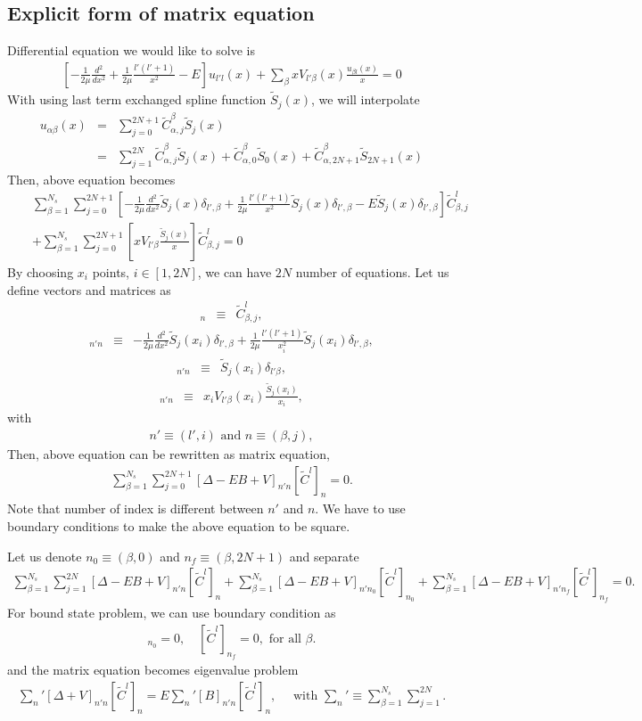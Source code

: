 \documentclass[10pt]{book}
\newcommand{\bea}{\begin{eqnarray}}
\newcommand{\eea}{\end{eqnarray}}
\newcommand{\no}{\nonumber \\}
\begin{document}
\subsection{Explicit form of matrix equation}
Differential equation we would like to solve is
\bea 
\left[ -\frac{1}{2\mu}\frac{d^2}{dx^2}+\frac{1}{2\mu}\frac{l'(l'+1)}{x^2}-E\right] 
u_{l' l}(x)+\sum_{\beta} x V_{l'\beta}(x) \frac{u_{\beta l}(x)}{x} =0
\eea 
With using last term exchanged spline function $\tilde{S}_j(x)$,
we will interpolate
\bea 
u_{\alpha\beta}(x)&=&\sum_{j=0}^{2N+1}\tilde{C}_{\alpha,j}^{\beta} \tilde{S}_j(x) \no 
                  &=&\sum_{j=1}^{2N} \tilde{C}_{\alpha,j}^{\beta} \tilde{S}_j(x)
                  +\tilde{C}_{\alpha,0}^{\beta} \tilde{S}_0(x)
                  +\tilde{C}_{\alpha,2N+1}^{\beta} \tilde{S}_{2N+1}(x)
\eea 
Then, above equation becomes
\bea 
& &\sum_{\beta=1}^{N_{s}}\sum_{j=0}^{2N+1} 
\left[-\frac{1}{2\mu}\frac{d^2}{dx^2}\tilde{S}_j(x)\delta_{l',\beta}
     +\frac{1}{2\mu}\frac{l'(l'+1)}{x^2}\tilde{S}_j(x)\delta_{l',\beta}-E\tilde{S}_j(x)\delta_{l',\beta}
     \right]
     \tilde{C}_{\beta,j}^{l} \no 
& &+\sum_{\beta=1}^{N_{s}}\sum_{j=0}^{2N+1}
 \left[x V_{l'\beta}\frac{\tilde{S}_j(x)}{x} \right]\tilde{C}_{\beta,j}^{l} =0
\eea 
By choosing $x_i$ points, $i\in[1,2N]$, 
we can have $2N$ number of equations.
Let us define vectors and matrices as
\bea 
[\tilde{C}^l]_{n}&\equiv& \tilde{C}^l_{\beta,j} ,
\eea
\bea 
[\Delta]_{n'n}&\equiv& 
         -\frac{1}{2\mu}\frac{d^2}{dx^2}\tilde{S}_j(x_i)\delta_{l',\beta}
              +\frac{1}{2\mu}\frac{l'(l'+1)}{x_i^2}\tilde{S}_j(x_i)\delta_{l',\beta},   
\eea 
\bea 
[B]_{n'n}&\equiv& \tilde{S}_j(x_i) \delta_{l'\beta}, 
\eea 
\bea 
[V]_{n'n}&\equiv& x_i V_{l'\beta}(x_i)\frac{\tilde{S}_j(x_i)}{x_i}, 
\eea 
with
\bea 
n'\equiv(l',i) \mbox{ and }  n\equiv(\beta,j),
\eea 
Then, above equation can be rewritten as matrix equation,
\bea 
\sum_{\beta=1}^{N_{s}}\sum_{j=0}^{2N+1}[\Delta -E B +V]_{n'n}[\tilde{C}^l]_n=0.
\eea 
Note that number of index is different between $n'$ and $n$. 
We have to use boundary conditions to make the above equation to be 
square. 

Let us denote $n_0\equiv(\beta,0)$ and $n_f\equiv(\beta,2N+1)$ and separate
\bea 
\sum_{\beta=1}^{N_{s}}\sum_{j=1}^{2N}[\Delta -E B +V]_{n'n}[\tilde{C}^l]_n
+\sum_{\beta=1}^{N_{s}}[\Delta -E B +V]_{n'n_0}[\tilde{C}^l]_{n_0}
+\sum_{\beta=1}^{N_{s}}[\Delta -E B +V]_{n'n_f}[\tilde{C}^l]_{n_f}
=0.
\eea 
For bound state problem, we can use boundary condition as
\bea 
[\tilde{C}^l]_{n_0}=0,\quad [\tilde{C}^l]_{n_f}=0, \mbox{ for all }\beta. 
\eea  
and the matrix equation becomes eigenvalue problem
\bea 
{\sum_{n}}'[\Delta+V]_{n'n}[\tilde{C}^l]_n=E{\sum_{n}}'[B]_{n'n}[\tilde{C}^l]_n,
\quad \mbox{ with } {\sum_{n}}'\equiv \sum_{\beta=1}^{N_s}\sum_{j=1}^{2N}.
\eea 
\end{document}
